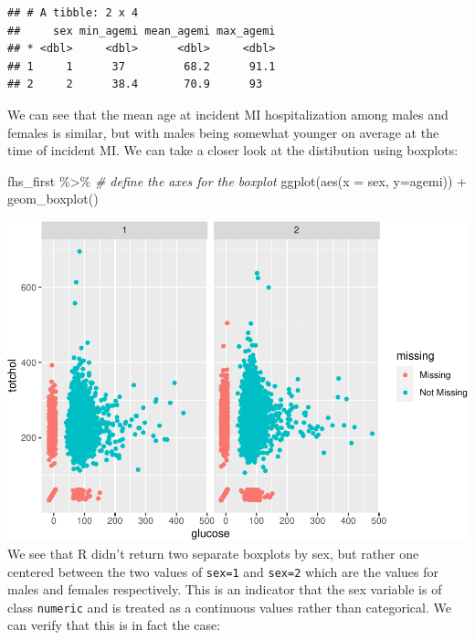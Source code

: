 \documentclass[
]{book}
\newenvironment{Shaded}{\begin{snugshade}}{\end{snugshade}}
\newcommand{\AttributeTok}[1]{\textcolor[rgb]{0.77,0.63,0.00}{#1}}
\newcommand{\CommentTok}[1]{\textcolor[rgb]{0.56,0.35,0.01}{\textit{#1}}}
\newcommand{\FunctionTok}[1]{\textcolor[rgb]{0.00,0.00,0.00}{#1}}
\newcommand{\NormalTok}[1]{#1}
\newcommand{\SpecialCharTok}[1]{\textcolor[rgb]{0.00,0.00,0.00}{#1}}
\begin{document}
\begin{verbatim}
## # A tibble: 2 x 4
##     sex min_agemi mean_agemi max_agemi
## * <dbl>     <dbl>      <dbl>     <dbl>
## 1     1      37         68.2      91.1
## 2     2      38.4       70.9      93
\end{verbatim}

We can see that the mean age at incident MI hospitalization among males and females is similar, but with males being somewhat younger on average at the time of incident MI. We can take a closer look at the distibution using boxplots:

\begin{Shaded}
\begin{Highlighting}[]
\NormalTok{fhs\_first }\SpecialCharTok{\%\textgreater{}\%} 
  \CommentTok{\# define the axes for the boxplot}
  \FunctionTok{ggplot}\NormalTok{(}\FunctionTok{aes}\NormalTok{(}\AttributeTok{x =}\NormalTok{ sex, }\AttributeTok{y=}\NormalTok{agemi)) }\SpecialCharTok{+} 
  \FunctionTok{geom\_boxplot}\NormalTok{()}
\end{Highlighting}
\end{Shaded}

\includegraphics{adv_epi_analysis_files/figure-latex/unnamed-chunk-138-1.pdf}
We see that R didn't return two separate boxplots by sex, but rather one centered between the two values of \texttt{sex=1} and \texttt{sex=2} which are the values for males and females respectively. This is an indicator that the sex variable is of class \texttt{numeric} and is treated as a continuous values rather than categorical. We can verify that this is in fact the case:

\begin{Shaded}
\end{Shaded}
\end{document}
